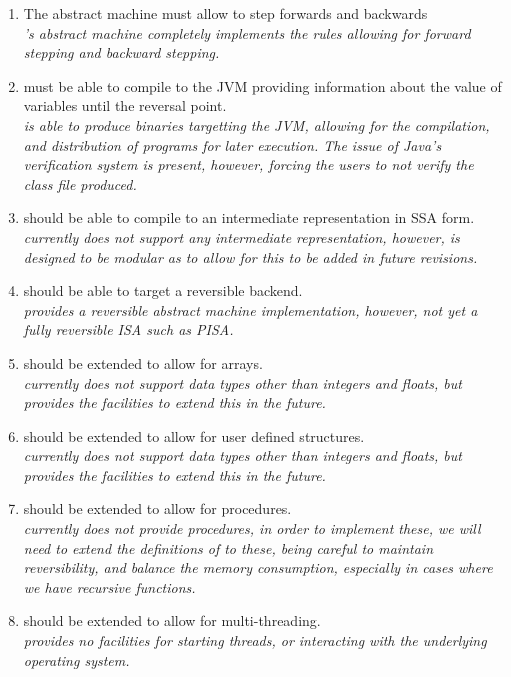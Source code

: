 \begin{enumerate}
    \item The \rimp abstract machine must allow to step forwards and backwards \\
    \textit{\rimp's abstract machine completely implements the rules allowing for forward stepping and backward stepping.}
    \item \rimp must be able to compile to the JVM providing information about the value of variables until the reversal point. \\
    \textit{\rimp is able to produce binaries targetting the JVM, allowing for the compilation, and distribution of \rimp programs for later execution. The issue of Java's verification system is present, however, forcing the users to not verify the class file produced.}
    \item \rimp should be able to compile to an intermediate representation in SSA form. \\
    \textit{\rimp currently does not support any intermediate representation, however, is designed to be modular as to allow for this to be added in future revisions.}
    \item \rimp should be able to target a reversible backend. \\
    \textit{\rimp provides a reversible abstract machine implementation, however, not yet a fully reversible ISA such as PISA\cite{pisa}.}
    \item \rimp should be extended to allow for arrays. \\
    \textit{\rimp currently does not support data types other than integers and floats, but provides the facilities to extend this in the future.}
    \item \rimp should be extended to allow for user defined structures. \\
    \textit{\rimp currently does not support data types other than integers and floats, but provides the facilities to extend this in the future.}
    \item \rimp should be extended to allow for procedures. \\
    \textit{\rimp currently does not provide procedures, in order to implement these, we will need to extend the definitions of \rimp to these, being careful to maintain reversibility, and balance the memory consumption, especially in cases where we have recursive functions.}
    \item \rimp should be extended to allow for multi-threading. \\
    \textit{\rimp provides no facilities for starting threads, or interacting with the underlying operating system.}
\end{enumerate}

